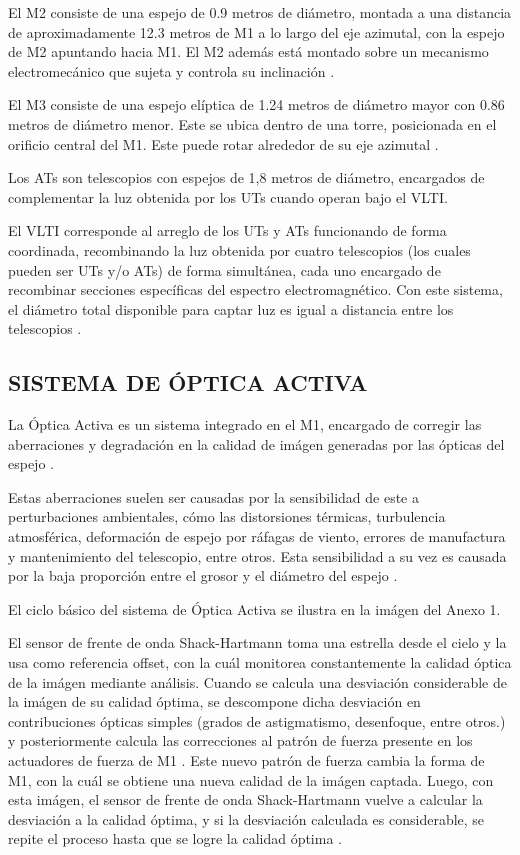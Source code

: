 El M2 consiste de una espejo de 0.9 metros de diámetro, montada a una distancia de aproximadamente 12.3 metros de M1 a lo largo del eje azimutal, con la espejo de M2 apuntando hacia M1. El M2 además está montado sobre un mecanismo electromecánico que sujeta y controla su inclinación \cite{eso2011m2}.

El M3 consiste de una espejo elíptica de 1.24 metros de diámetro mayor con 0.86 metros de diámetro menor. Este se ubica dentro de una torre, posicionada en el orificio central del M1. Este puede rotar alrededor de su eje azimutal \cite{eso2011m1}.

Los ATs son telescopios con espejos de 1,8 metros de diámetro, encargados de complementar la luz obtenida por los UTs cuando operan bajo el VLTI.

El VLTI corresponde al arreglo de los UTs y ATs funcionando de forma coordinada, recombinando la luz obtenida por cuatro telescopios (los cuales pueden ser UTs y/o ATs) de forma simultánea, cada uno encargado de recombinar secciones específicas del espectro electromagnético. Con este sistema, el diámetro total disponible para captar luz es igual a distancia entre los telescopios \cite{eso1998vlt}.

\subsection{SISTEMA DE ÓPTICA ACTIVA}
La Óptica Activa es un sistema integrado en el M1, encargado de corregir las aberraciones y degradación en la calidad de imágen generadas por las ópticas del espejo \cite{eso1998vlt}. 

Estas aberraciones suelen ser causadas por la sensibilidad de este a perturbaciones ambientales, cómo las distorsiones térmicas, turbulencia atmosférica, deformación de espejo por ráfagas de viento, errores de manufactura y mantenimiento del telescopio, entre otros. Esta sensibilidad a su vez es causada por la baja proporción entre el grosor y el diámetro del espejo \cite{wilson1987active}.

El ciclo básico del sistema de Óptica Activa se ilustra en la imágen del Anexo 1.

El sensor de frente de onda Shack-Hartmann toma una estrella desde el cielo y la usa como referencia offset, con la cuál monitorea constantemente la calidad óptica de la imágen mediante análisis. Cuando se calcula una desviación considerable de la imágen de su calidad óptima, se descompone dicha desviación en contribuciones ópticas simples (grados de astigmatismo, desenfoque, entre otros.) y posteriormente calcula las correcciones al patrón de fuerza presente en los actuadores de fuerza de M1 \cite{eso1998vlt}.
Este nuevo patrón de fuerza cambia la forma de M1, con la cuál se obtiene una nueva calidad de la imágen captada. Luego, con esta imágen, el sensor de frente de onda Shack-Hartmann vuelve a calcular la desviación a la calidad óptima, y si la desviación calculada es considerable, se repite el proceso hasta que se logre la calidad óptima \cite{eso1998vlt}\cite{wilson1987active}.

